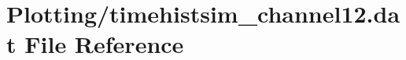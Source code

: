\hypertarget{Plotting_2timehistsim__channel12_8dat}{}\section{Plotting/timehistsim\+\_\+channel12.dat File Reference}
\label{Plotting_2timehistsim__channel12_8dat}
